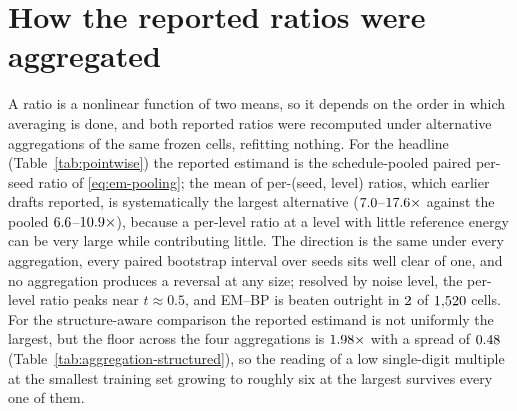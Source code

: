 \section{How the reported ratios were aggregated}\label{sec:aggregation-headline}

A ratio is a nonlinear function of two means, so it depends on the order in
which averaging is done, and both reported ratios were recomputed under
alternative aggregations of the same frozen cells, refitting nothing. For
the headline (Table~\ref{tab:pointwise}) the reported estimand is the
schedule-pooled paired per-seed ratio of \eqref{eq:em-pooling}; the mean of
per-(seed, level) ratios, which earlier drafts reported, is systematically
the largest alternative ($7.0$--$17.6\times$ against
the pooled $6.6$--$10.9\times$), because a per-level ratio at a level
with little reference energy can be very large while contributing little.
The direction is the same under every aggregation, every paired bootstrap
interval over seeds sits well clear of one, and no aggregation produces a
reversal at any size; resolved by noise level, the per-level ratio peaks near
$t \approx 0.5$, and EM--BP is beaten outright in $2$ of
$1{,}520$ cells. For the structure-aware comparison the reported estimand
is not uniformly the largest, but the floor across the four aggregations is
$1.98\times$ with a spread of $0.48$
(Table~\ref{tab:aggregation-structured}), so the reading of a low single-digit
multiple at the smallest training set growing to roughly six at the largest
survives every one of them.

\providecommand{\headlinetable}{Table~\ref{tab:pointwise}}
\providecommand{\structuredtable}{Table~\ref{tab:structured}}


\setlength{\emergencystretch}{0pt}
